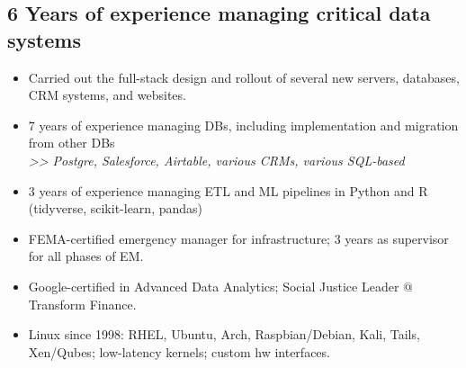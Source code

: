 \documentclass[]{deedy-resume-openfont}
\begin{document}


\vspace{5pt} 
\vspace{\topsep}

\subsection{6 Years of experience managing critical data systems}
\vspace{\topsep}
    \begin{itemize}
    	\item Carried out the full-stack design and rollout of several new servers, databases, CRM systems, and websites.
        \item 7 years of experience managing DBs, including implementation and migration from other DBs \\ \textit{>> Postgre, Salesforce, Airtable, various CRMs, various SQL-based}
        \item 3 years of experience managing ETL and ML pipelines in Python and R (tidyverse, scikit-learn, pandas)
        \item FEMA-certified emergency manager for infrastructure; 3 years as supervisor for all phases of EM.
        \item Google-certified in Advanced Data Analytics;  Social Justice Leader @ Transform Finance.
        \item Linux since 1998: RHEL, Ubuntu, Arch, Raspbian/Debian, Kali, Tails, Xen/Qubes; low-latency kernels; custom hw interfaces.
    \end{itemize}
\end{document}

